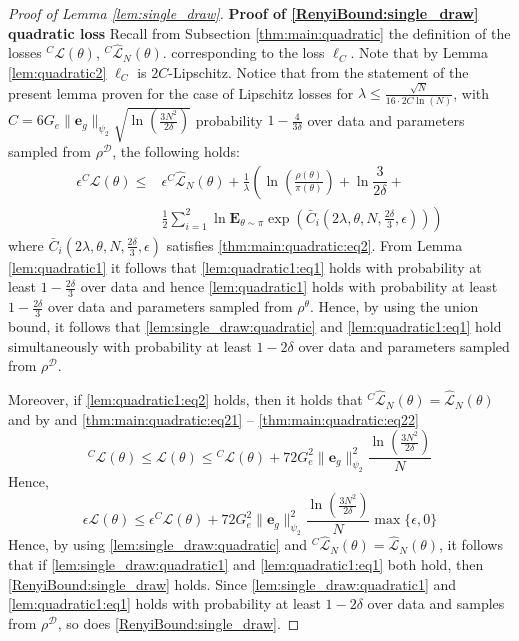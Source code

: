 \documentclass{article}
\newcommand{\train}{\mathcal{D}}
\newcommand{\e}{\mathbf{e}}
\newcommand{\bE}{\mathbf{E}}
\begin{document}
\begin{proof}[Proof of Lemma \ref{lem:single_draw}]
\textbf{Proof of \eqref{RenyiBound:single_draw} quadratic loss}
Recall from Subsection \ref{thm:main:quadratic} the definition of the losses ${}^C \mathcal{L}(\theta)$, ${}^C \hat{\mathcal{L}}_N(\theta)$.
corresponding to the loss $\ell_C$. Note that by Lemma \ref{lem:quadratic2}  $\ell_C$ is $2C$-Lipschitz.
Notice that from the statement of the present lemma  proven for the case of Lipschitz losses
for $\lambda \le \frac{\sqrt{N}}{16 \cdot 2C\ln(N)}$,  with 
$C=6G_e\|\e_g\|_{\psi_2}\sqrt{\ln(\frac{3N^2}{2\delta})}$ probability $1-\frac{4}{3\delta}$ over data and parameters sampled
from $\rho^{\train}$, the following holds:
\begin{equation}
  \label{lem:single_draw:quadratic}
  \begin{aligned}
\epsilon {}^C\mathcal{L}(\theta)
         \leq  &  \epsilon {}^C \hat{\mathcal{L}}_N(\theta) +  
          \frac{1}{\lambda}\left( \ln\left(\frac{\rho(\theta)}{\pi(\theta)}\right) + \ln\dfrac{3}{2\delta} + \right. \\
          &  \left. \frac{1}{2} \sum_{i=1}^2 \ln \bE_{\theta \sim \pi} \exp\left(\bar{C}_i(2\lambda,\theta,N,\frac{2\delta}{3},\epsilon)\right)\right)
  \end{aligned}
\end{equation}
where $\bar{C}_i(2\lambda,\theta,N,\frac{2\delta}{3},\epsilon)$ satisfies \eqref{thm:main:quadratic:eq2}.
From Lemma \ref{lem:quadratic1} it follows that \eqref{lem:quadratic1:eq1} holds with probability at least
$1-\frac{2\delta}{3}$ 
over data and hence \eqref{lem:quadratic1} holds with probability at least $1-\frac{2\delta}{3}$ over data and parameters sampled from $\rho ^{\theta}$. Hence, by using the union bound, it follows that
\eqref{lem:single_draw:quadratic} and \eqref{lem:quadratic1:eq1} hold
simultaneously 
with probability at least  $1-2\delta$ over data and parameters sampled from $\rho^{\train}$.

Moreover, if 
\eqref{lem:quadratic1:eq2} holds, then %
it holds that 
${}^C \hat{\mathcal{L}}_N(\theta)=\hat{\mathcal{L}}_N(\theta)$ 
and by and \eqref{thm:main:quadratic:eq21} -- \eqref{thm:main:quadratic:eq22} 
\[ 
    {}^C \mathcal{L}(\theta) \le \mathcal{L}(\theta) \le  {}^C \mathcal{L}(\theta)+ 72G_e^2\|\e_g\|_{\psi_2}^2 \frac{\ln\left(\frac{3N^2}{2\delta}\right)}{N}
\]
Hence, 
\begin{equation} 
  \label{lem:single_draw:quadratic1}
    \epsilon \mathcal{L}(\theta) \le \epsilon {}^C \mathcal{L}(\theta)+ 72G_e^2\|\e_g\|_{\psi_2}^2\frac{\ln\left(\frac{3N^2}{2\delta}\right)}{N} \max\{\epsilon,0\}
\end{equation}
 Hence, by using \eqref{lem:single_draw:quadratic} and ${}^C \hat{\mathcal{L}}_N(\theta)=\hat{\mathcal{L}}_N(\theta)$,
 it follows that if  \eqref{lem:single_draw:quadratic1} and \eqref{lem:quadratic1:eq1} both hold, then 
 \eqref{RenyiBound:single_draw} holds. Since \eqref{lem:single_draw:quadratic1} and \eqref{lem:quadratic1:eq1} holds
 with probability at least $1-2\delta$ over data and samples from $\rho^{\train}$, so does  \eqref{RenyiBound:single_draw}.


\end{proof}
\end{document}
